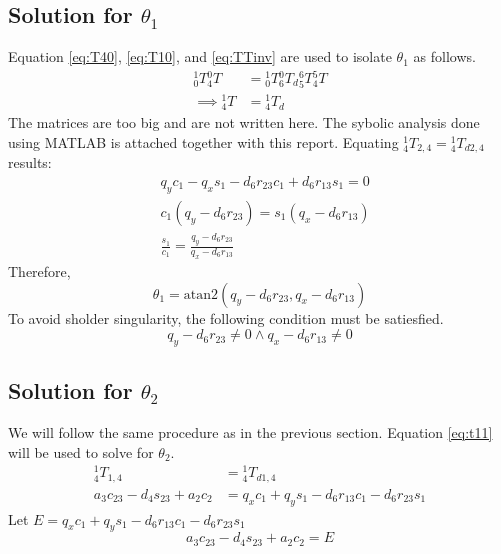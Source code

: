\subsection{Solution for $\theta_1$}
Equation \ref{eq:T40}, \ref{eq:T10}, and \ref{eq:TTinv} are used to isolate $\theta_1$ as follows.
\begin{equation} \label{eq:t11}
    \begin{aligned}
        {_0^{1}}T{_4^{0}}T & ={_0^{1}}T{_6^{0}}T_d{_5^{6}}T{_4^{5}}T \\
        \implies{_4^{1}}T  & ={_4^{1}}T_d
    \end{aligned}
\end{equation}
The matrices are too big and are not written here. The sybolic analysis done using MATLAB is attached together with this report.
Equating ${_4^{1}}T_{2,4}={_4^{1}}T_{d2,4}$ results:
\begin{equation} \label{eq:t12}
    \begin{aligned}
         & q_yc_1 - q_xs_1 - d_6r_{23}c_1 + d_6r_{13}s_1=0               \\
         & c_1\left(q_y-d_6r_{23}\right) = s_1\left(q_x-d_6r_{13}\right) \\
         & \frac{s_1}{c_1}=\frac{q_y-d_6r_{23}}{q_x-d_6r_{13}}
    \end{aligned}
\end{equation}
Therefore,
\begin{equation} \label{eq:t13}
    \theta_1=\mathrm{atan2}\left(q_y-d_6r_{23},q_x-d_6r_{13}\right)
\end{equation}
To avoid sholder singularity, the following condition must be satiesfied.
\begin{equation} \label{eq:t1_singularity}
    q_y-d_6r_{23}\neq0 \land q_x-d_6r_{13}\neq0
\end{equation}

\subsection{Solution for $\theta_2$}
We will follow the same procedure as in the previous section.
Equation \ref{eq:t11} will be used to solve for $\theta_2$.
\begin{equation} \label{eq:t21}
    \begin{aligned}
        {_4^{1}}T_{1,4}                & ={_4^{1}}T_{d1,4}                              \\
        a_3c_{23} - d_4s_{23} + a_2c_2 & =q_xc_1 + q_ys_1 - d_6r_{13}c_1 - d_6r_{23}s_1
    \end{aligned}
\end{equation}
Let $E=q_xc_1 + q_ys_1 - d_6r_{13}c_1 - d_6r_{23}s_1$
\begin{equation} \label{eq:t22}
    a_3c_{23} - d_4s_{23} + a_2c_2=E
\end{equation}

